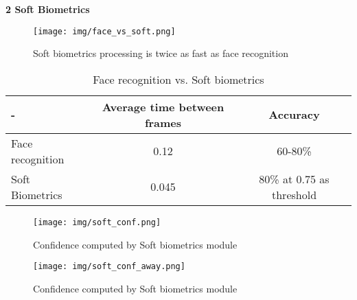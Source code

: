 \documentclass[12pt]{article}			%
\begin{document}

{\Large \bf 2     Soft Biometrics}
\begin{figure}[h]
	\centering
	\texttt{[image: img/face\_vs\_soft.png]}
	\caption{ \small Soft biometrics processing is twice as fast as face recognition} 
	\label{fig:sb1}
\end{figure}

\begin{table}[htp]
\centering
\caption{Face recognition vs. Soft biometrics}
\begin{tabular}{||l|c|c||} \hline \hline
-                  &  Average time between frames  &  Accuracy \\ \hline
Face recognition   &  0.12                         &  60-80\% \\ \hline
Soft Biometrics    &  0.045                        &  80\% at 0.75 as threshold \\ \hline \hline
\end{tabular}
\end{table}

\begin{figure}[h]
	\centering
	\texttt{[image: img/soft\_conf.png]}
	\caption{ \small Confidence computed by Soft biometrics module}
	\label{fig:sb2}
\end{figure}

\begin{figure}[h]
	\centering
	\texttt{[image: img/soft\_conf\_away.png]}
	\caption{ \small Confidence computed by Soft biometrics module}
	\label{fig:sb2}
\end{figure}
\end{document}
